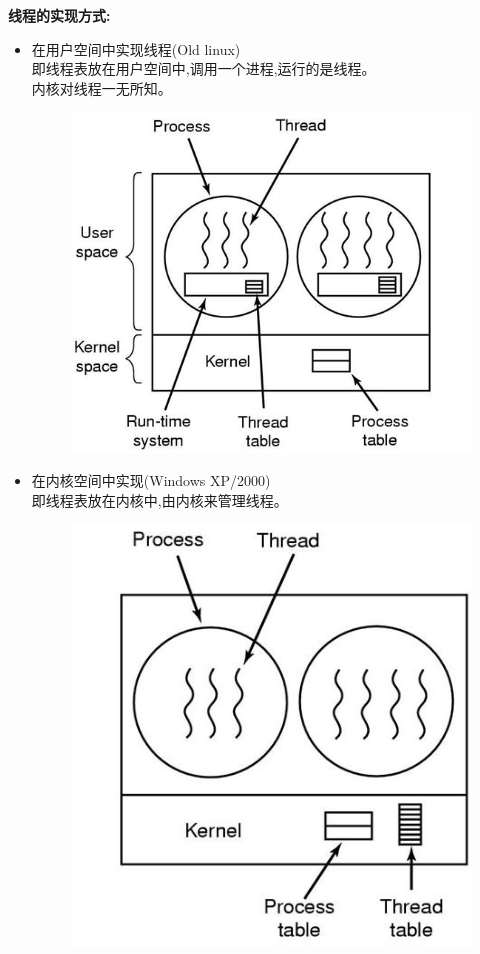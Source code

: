 \documentclass[UTF8,a4paper]{ctexart}
\begin{document}
\textbf{线程的实现方式:}
\begin{itemize}
	\item 在用户空间中实现线程(Old linux)\\
	      即线程表放在用户空间中,调用一个进程,运行的是线程。\\
	      内核对线程一无所知。
	      \begin{figure}[H]
		      \centering
		      \includegraphics[scale = 0.3]{assets/ModernOperatingSystems_df08d.png}
	      \end{figure}
	\item 在内核空间中实现(Windows XP/2000)\\
	      即线程表放在内核中,由内核来管理线程。
	      \begin{figure}[H]
		      \centering
		      \includegraphics[scale = 0.3]{assets/ModernOperatingSystems_d3de3.png}

\end{figure}
\end{itemize}
\end{document}

